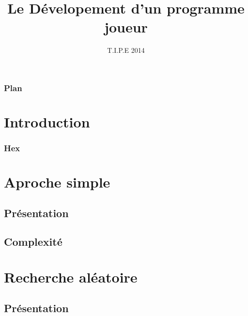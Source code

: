 \documentclass{beamer}
\title[Hex]{Le Dévelopement d'un programme joueur}
\date{T.I.P.E 2014}
\begin{document}
\begin{frame}
  \titlepage
\end{frame}

\begin{frame}
  \frametitle{Plan}
  \tableofcontents
\end{frame}

\section{Introduction}

\begin{frame}
  \frametitle{Hex}
  \begin{HexBoard}[board size=10]
  \end{HexBoard}
\end{frame}

\section{Aproche simple}

\subsection{Présentation}


\subsection{Complexité}


\section{Recherche aléatoire}

\subsection{Présentation}
\end{document}
